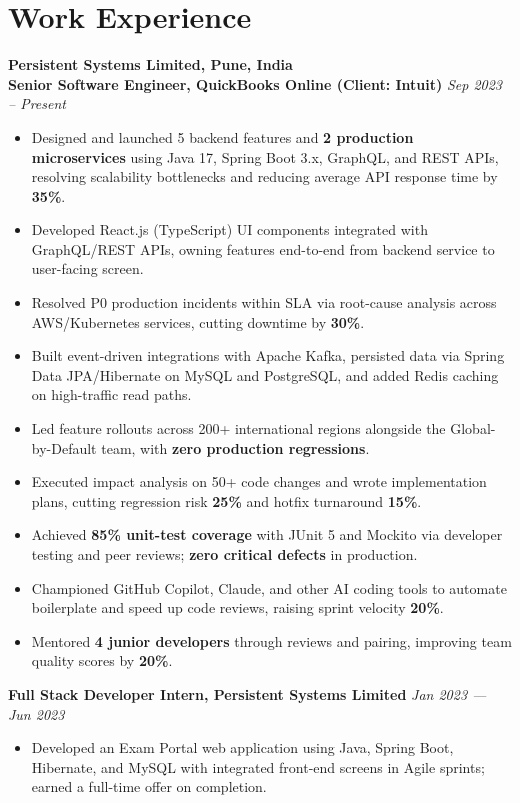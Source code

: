 \documentclass[10pt, letterpaper]{article}
\newcommand{\bulletlist}{\begin{itemize}[leftmargin=0.18in, itemsep=0pt, parsep=0pt, topsep=1pt]}
\newcommand{\bulletlistend}{\end{itemize}}
\begin{document}
\section{Work Experience}

\textbf{Persistent Systems Limited, Pune, India} \\
\textbf{Senior Software Engineer, QuickBooks Online (Client: Intuit)} \hfill \textit{Sep 2023 -- Present}
\bulletlist
    \item Designed and launched 5 backend features and \textbf{2 production microservices} using Java 17, Spring Boot 3.x, GraphQL, and REST APIs, resolving scalability bottlenecks and reducing average API response time by \textbf{35\%}.
    \item Developed React.js (TypeScript) UI components integrated with GraphQL/REST APIs, owning features end-to-end from backend service to user-facing screen.
    \item Resolved P0 production incidents within SLA via root-cause analysis across AWS/Kubernetes services, cutting downtime by \textbf{30\%}.
    \item Built event-driven integrations with Apache Kafka, persisted data via Spring Data JPA/Hibernate on MySQL and PostgreSQL, and added Redis caching on high-traffic read paths.
    \item Led feature rollouts across 200+ international regions alongside the Global-by-Default team, with \textbf{zero production regressions}.
    \item Executed impact analysis on 50+ code changes and wrote implementation plans, cutting regression risk \textbf{25\%} and hotfix turnaround \textbf{15\%}.
    \item Achieved \textbf{85\% unit-test coverage} with JUnit 5 and Mockito via developer testing and peer reviews; \textbf{zero critical defects} in production.
    \item Championed GitHub Copilot, Claude, and other AI coding tools to automate boilerplate and speed up code reviews, raising sprint velocity \textbf{20\%}.
    \item Mentored \textbf{4 junior developers} through reviews and pairing, improving team quality scores by \textbf{20\%}.
\bulletlistend

\textbf{Full Stack Developer Intern, Persistent Systems Limited} \hfill \textit{Jan 2023 --- Jun 2023}
\bulletlist
    \item Developed an Exam Portal web application using Java, Spring Boot, Hibernate, and MySQL with integrated front-end screens in Agile sprints; earned a full-time offer on completion.
\bulletlistend
\end{document}
